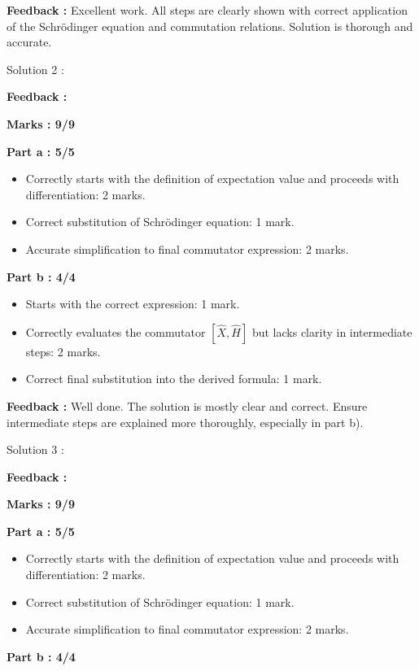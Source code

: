 \documentclass[a4paper,11pt]{article}
\begin{document}
\textbf{Feedback :}
Excellent work. All steps are clearly shown with correct application of the Schrödinger equation and commutation relations. Solution is thorough and accurate.



Solution 2 :

\textbf{Feedback :}

\textbf{Marks : 9/9}

\textbf{Part a : 5/5}

\begin{itemize}
    \item Correctly starts with the definition of expectation value and proceeds with differentiation: 2 marks.
    \item Correct substitution of Schrödinger equation: 1 mark.
    \item Accurate simplification to final commutator expression: 2 marks.
\end{itemize}


\textbf{Part b : 4/4}

\begin{itemize}
    \item Starts with the correct expression: 1 mark.
    \item Correctly evaluates the commutator $[\hat{X}, \hat{H}]$ but lacks clarity in intermediate steps: 2 marks.
    \item Correct final substitution into the derived formula: 1 mark.
\end{itemize}

\textbf{Feedback :}
Well done. The solution is mostly clear and correct. Ensure intermediate steps are explained more thoroughly, especially in part b).



Solution 3 :

\textbf{Feedback :}

\textbf{Marks : 9/9}

\textbf{Part a : 5/5}

\begin{itemize}
    \item Correctly starts with the definition of expectation value and proceeds with differentiation: 2 marks.
    \item Correct substitution of Schrödinger equation: 1 mark.
    \item Accurate simplification to final commutator expression: 2 marks.
\end{itemize}


\textbf{Part b : 4/4}
\end{document}
